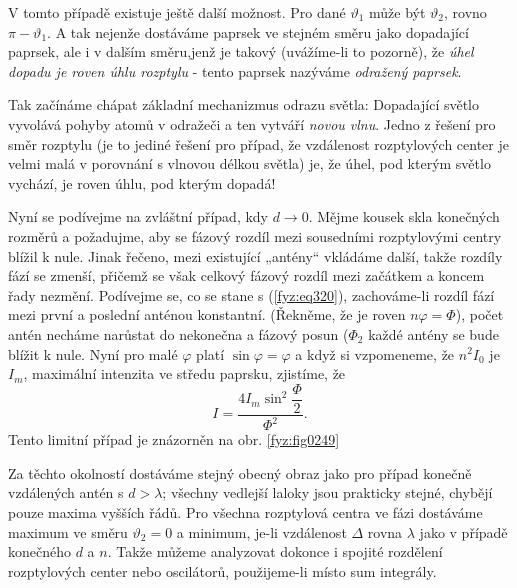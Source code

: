     V tomto případě existuje ještě další možnost. Pro dané \(\vartheta_1\) může být 
    \(\vartheta_2\), rovno \(\pi-\vartheta_1\). A tak nejenže dostáváme paprsek ve stejném směru 
    jako dopadající paprsek, ale i v dalším směru,jenž je takový (uvážíme-li to pozorně), že 
    \emph{úhel dopadu je roven úhlu rozptylu} - tento paprsek nazýváme \emph{odražený paprsek}.
    
    Tak začínáme chápat základní mechanizmus odrazu světla: Dopadající světlo vyvolává pohyby atomů 
    v odražeči a ten vytváří \emph{novou vlnu}. Jedno z řešení pro směr rozptylu (je to jediné 
    řešení pro případ, že vzdálenost rozptylových center je velmi malá v porovnání s vlnovou délkou 
    světla) je, že úhel, pod kterým světlo vychází, je roven úhlu, pod kterým dopadá!
    
    Nyní se podívejme na zvláštní případ, kdy \(d\rightarrow 0\). Mějme kousek skla konečných 
    rozměrů a požadujme, aby se fázový rozdíl mezi sousedními rozptylovými centry blížil k nule. 
    Jinak řečeno, mezi existující „antény“ vkládáme další, takže rozdíly fází se zmenší, přičemž se 
    však celkový fázový rozdíl mezi začátkem a koncem řady nezmění. Podívejme se, co se stane s 
    (\ref{fyz:eq320}), zachováme-li rozdíl fází mezi první a poslední anténou konstantní. (Řekněme, 
    že je roven \(n\varphi = \Phi\)), počet antén necháme narůstat do nekonečna a fázový posun 
    (\(\Phi_2\) každé antény se bude blížit k nule. Nyní pro malé \(\varphi\) platí 
    \(\sin\varphi=\varphi\) a když si vzpomeneme, že \(n^2I_0\) je \(I_m\), maximální intenzita ve 
    středu paprsku, zjistíme, že
    \begin{equation}\label{fyz:eq325}
      I = \frac{4I_m\sin^2\dfrac{\Phi}{2}}{\Phi^2}.
    \end{equation}
    Tento limitní případ je znázorněn na obr. \ref{fyz:fig0249}
    
    Za těchto okolností dostáváme stejný obecný obraz jako pro případ konečně vzdálených antén s 
    \(d > \lambda\); všechny vedlejší laloky jsou prakticky stejné, chybějí pouze maxima vyšších 
    řádů. Pro všechna rozptylová centra ve fázi dostáváme maximum ve směru \(\vartheta_2 = 0\) a 
    minimum, je-li vzdálenost \(\Delta\) rovna \(\lambda\) jako v případě konečného \(d\) a \(n\). 
    Takže můžeme analyzovat dokonce i spojité rozdělení rozptylových center nebo oscilátorů, 
    použijeme-li místo sum integrály.
    
